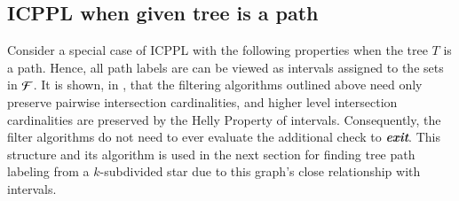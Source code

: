 \documentclass[MS,synopsis]{iitmdiss}
\begin{document}
\subsection*{ICPPL when given tree is a path}
\label{sec:icpplicpia}
Consider a special case of ICPPL with the following properties when
the tree $T$ is a path.  Hence, all path labels are can be viewed as
intervals assigned to the sets in ${\cal F}$.  It is shown, in
\cite{nsnrs09}, that the filtering algorithms outlined above need only
preserve pairwise intersection cardinalities, and higher level
intersection cardinalities are preserved by the Helly Property of
intervals.  Consequently, the filter algorithms do not need to ever
evaluate the additional check to {\em \bf exit}.
This structure and its algorithm is
used in the next section for finding tree path labeling from a
$k$-subdivided star due to this graph's close relationship with
intervals. 
\end{document}
